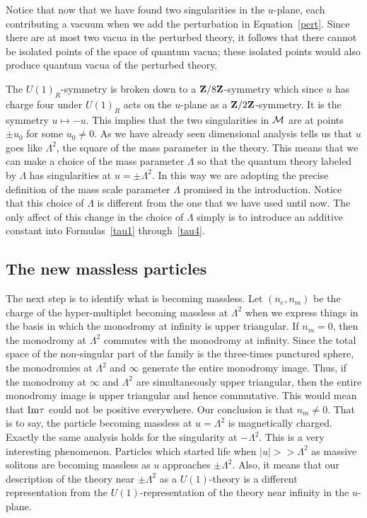 \documentclass[10pt]{article}
\begin{document}
Notice that now that we have found two singularities in the $u$-plane,
each contributing a vacuum when we add the perturbation in
Equation~\ref{pert}.  Since there are at most two vacua in the
perturbed theory, it follows that there cannot be isolated points of
the space of quantum vacua; these
isolated points would also  produce quantum vacua of the perturbed
theory. 


The $U(1)_R$-symmetry is broken down to a ${\bf Z}/8{\bf Z}$-symmetry
which since $u$ has charge four under $U(1)_R$ acts on the $u$-plane
as a ${\bf Z}/2{\bf Z}$-symmetry. It is the symmetry $u\mapsto -u$. 
This implies
that the two singularities in ${\cal M}$ are at points $\pm u_0$ for
some $u_0\not= 0$. As we have already seen dimensional analysis tells
us that $u$ goes like $\Lambda^2$, the square of the mass parameter in
the theory. This means that we can make a choice of the mass
parameter  $\Lambda$ so that  
the quantum theory labeled by  $\Lambda$ has singularities at
$u=\pm \Lambda^2$. In this way we are adopting the precise definition of
the mass scale parameter $\Lambda$  promised in the introduction.
Notice that this  choice of $\Lambda$ is different from the one that
we have used until now.  The only affect of this change in the choice of
$\Lambda$ simply is to introduce an additive constant into
Formulas~\ref{tau1} through~\ref{tau4}. 

\subsection{The new massless particles}

The next step is to identify what is becoming massless.
Let $(n_e,n_m)$  be the charge of the  hyper-multiplet
becoming massless at $\Lambda^2$ when we express things in the basis
in which the monodromy at infinity is upper 
triangular. If $n_m=0$, then the monodromy at $\Lambda^2$ commutes
with the monodromy at infinity.  Since the total space of the
non-singular part of the family is the three-times punctured sphere,
the monodromies at $\Lambda^2$ and $\infty$ generate the entire monodromy
image. Thus, if the monodromy at $\infty$ and $\Lambda^2$ are
simultaneously upper triangular, then the entire monodromy image is
upper triangular and hence commutative.
This would mean that ${\rm Im}\tau$ could not be positive everywhere.
Our conclusion is that $n_m\not=0$.  That is to
say, the particle becoming massless at $u=\Lambda^2$ is magnetically
charged. 
Exactly the same analysis holds for the singularity at $-\Lambda^2$.
This is a very interesting phenomenon.  Particles which started life
when $|u|>>\Lambda^2$ as massive solitons are becoming massless as $u$
approaches $\pm \Lambda^2$.
Also, it means that our description of the theory near $\pm \Lambda^2$
as a $U(1)$-theory is a different representation from the
$U(1)$-representation of the theory near infinity in the $u$-plane.
\end{document}
